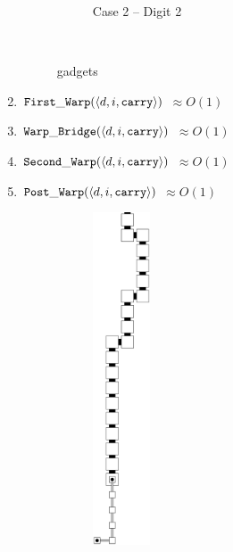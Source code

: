 \begin{enumerate}[label={--}]
\begin{figure}[h]
\begin{subfigure}[t]{0.2\textwidth}
                        \caption{\label{fig:warping/pre_warp_case2_digit2_msr} Case 2 -- Digit 2}
                    \end{subfigure}%
                    ~
                    \caption{\label{fig:pre_warp_gadgets} {\prewarp} gadgets }
                \end{figure}


            \item ${\tt First\_Warp} (\langle d, i, {\tt carry}\rangle)$ $\approx O(1)$

            \item ${\tt Warp\_Bridge}(\langle d, i, {\tt carry}\rangle)$ $\approx O(1)$

            \item ${\tt Second\_Warp}(\langle d, i, {\tt carry}\rangle)$ $\approx O(1)$

            \item ${\tt Post\_Warp}  (\langle d, i, {\tt carry}\rangle)$ $\approx O(1)$
                \begin{figure}[h]
                    \begin{subfigure}[t]{0.2\textwidth}
                        \centering
                        \includegraphics[width=0.2\textwidth]{warping/post_warp_general_digit1}

\end{subfigure}
\end{figure}
\end{enumerate}
